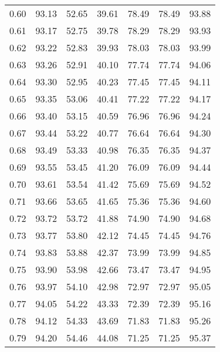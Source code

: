 \begin{tabular}{|c|c|c|c|c|c|c|}
      0.60 &     93.13 &     52.65 &      39.61 &   78.49 &      78.49 &         93.88 \\
      0.61 &     93.17 &     52.75 &      39.78 &   78.29 &      78.29 &         93.93 \\
      0.62 &     93.22 &     52.83 &      39.93 &   78.03 &      78.03 &         93.99 \\
      0.63 &     93.26 &     52.91 &      40.10 &   77.74 &      77.74 &         94.06 \\
      0.64 &     93.30 &     52.95 &      40.23 &   77.45 &      77.45 &         94.11 \\
      0.65 &     93.35 &     53.06 &      40.41 &   77.22 &      77.22 &         94.17 \\
      0.66 &     93.40 &     53.15 &      40.59 &   76.96 &      76.96 &         94.24 \\
      0.67 &     93.44 &     53.22 &      40.77 &   76.64 &      76.64 &         94.30 \\
      0.68 &     93.49 &     53.33 &      40.98 &   76.35 &      76.35 &         94.37 \\
      0.69 &     93.55 &     53.45 &      41.20 &   76.09 &      76.09 &         94.44 \\
      0.70 &     93.61 &     53.54 &      41.42 &   75.69 &      75.69 &         94.52 \\
      0.71 &     93.66 &     53.65 &      41.65 &   75.36 &      75.36 &         94.60 \\
      0.72 &     93.72 &     53.72 &      41.88 &   74.90 &      74.90 &         94.68 \\
      0.73 &     93.77 &     53.80 &      42.12 &   74.45 &      74.45 &         94.76 \\
      0.74 &     93.83 &     53.88 &      42.37 &   73.99 &      73.99 &         94.85 \\
      0.75 &     93.90 &     53.98 &      42.66 &   73.47 &      73.47 &         94.95 \\
      0.76 &     93.97 &     54.10 &      42.98 &   72.97 &      72.97 &         95.05 \\
      0.77 &     94.05 &     54.22 &      43.33 &   72.39 &      72.39 &         95.16 \\
      0.78 &     94.12 &     54.33 &      43.69 &   71.83 &      71.83 &         95.26 \\
      0.79 &     94.20 &     54.46 &      44.08 &   71.25 &      71.25 &         95.37 \\

\end{tabular}
